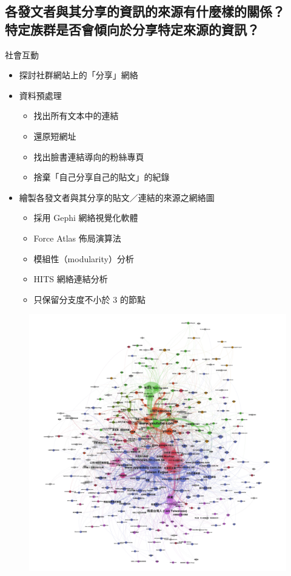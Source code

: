 \documentclass{beamer}
\begin{document}
\begin{CJK}{UTF8}{bkai}
\section{
各發文者與其分享的資訊的來源有什麼樣的關係？\texorpdfstring{\protect\\}{}
\hspace{.35em}特定族群是否會傾向於分享特定來源的資訊？
}

\begin{frame}{社會互動}
\begin{itemize}
\item 探討社群網站上的「分享」網絡
\item 資料預處理
  \begin{itemize}
  \item 找出所有文本中的連結
  \item 還原短網址
  \item 找出臉書連結導向的粉絲專頁
  \item 捨棄「自己分享自己的貼文」的紀錄
  \end{itemize}
\item 繪製各發文者與其分享的貼文／連結的來源之網絡圖
  \begin{itemize}
  \item 採用 Gephi 網絡視覺化軟體
  \item Force Atlas 佈局演算法
  \item 模組性（modularity）分析
  \item HITS 網絡連結分析
  \item 只保留分支度不小於 3 的節點
  \end{itemize}
\end{itemize}
\end{frame}

\begin{frame}[plain]
\begin{figure}
  \includegraphics[width=\textwidth, height=\textheight, keepaspectratio]{sna_sm}
\end{figure}
\end{frame}


\end{CJK}
\end{document}
